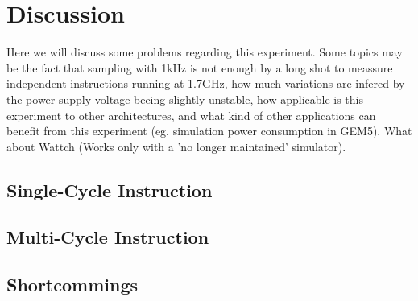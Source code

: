 \section{Discussion}
Here we will discuss some problems regarding this experiment. Some topics may be
the fact that sampling with 1kHz is not enough by a long shot to meassure
independent instructions running at 1.7GHz, how much variations are infered by
the power supply voltage beeing slightly unstable, how applicable is this
experiment to other architectures, and what kind of other applications can
benefit from this experiment (eg. simulation power consumption in GEM5). What
about Wattch (Works only with a 'no longer maintained' simulator).


\subsection{Single-Cycle Instruction}

\subsection{Multi-Cycle Instruction}

\subsection{Shortcommings}

